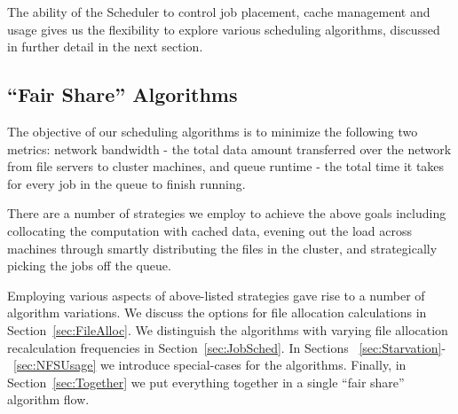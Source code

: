 The ability of the Scheduler to control job placement, cache management and usage gives us the flexibility to explore various scheduling algorithms, discussed in further detail in the next section.
\subsection{\label{sec:AlgoDesc}``Fair Share'' Algorithms}
The objective of our scheduling algorithms is to minimize the following two metrics: network bandwidth - the total data amount transferred over the network from file servers to cluster machines, and queue runtime - the total time it takes for every job in the queue to finish running.

There are a number of strategies we employ to achieve the above goals including collocating the computation with cached data, evening out the load across machines through smartly distributing the files in the cluster, and strategically picking the jobs off the queue.

Employing various aspects of above-listed strategies gave rise to a number of algorithm variations. We discuss the options for file allocation calculations in Section~\ref{sec:FileAlloc}. We distinguish the algorithms with varying file allocation recalculation frequencies in Section~\ref{sec:JobSched}. In Sections ~\ref{sec:Starvation}-~\ref{sec:NFSUsage} we introduce special-cases for the algorithms. Finally, in Section~\ref{sec:Together} we put everything together in a single ``fair share'' algorithm flow.

